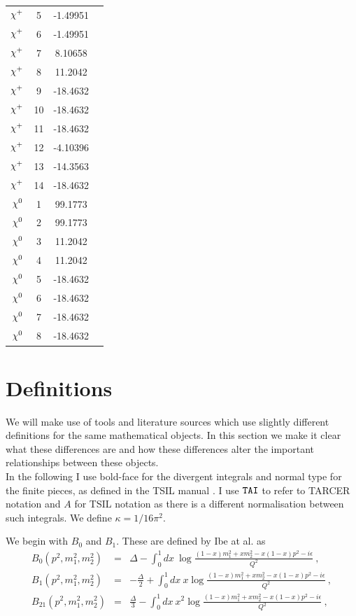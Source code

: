 \documentclass[11pt]{article}
\newcommand{\mychibig}{\raisebox{0pt}[1ex][1ex]{$\chi$}}
\newcommand{\tsil}{\textsf{TSIL} }
\newcommand{\tarcer}{\textsf{TARCER} }
\begin{document}
\begin{table}[h!]
\begin{tabular}{c c c c}
$\mychibig^+$ & 5 & -1.49951 \\ 
$\mychibig^+$ & 6 & -1.49951 \\ 
$\mychibig^+$ & 7 & 8.10658 \\ 
$\mychibig^+$ & 8 & 11.2042 \\ 
$\mychibig^+$ & 9 & -18.4632 \\ 
$\mychibig^+$ & 10 & -18.4632 \\ 
$\mychibig^+$ & 11 & -18.4632 \\ 
$\mychibig^+$ & 12 & -4.10396 \\ 
$\mychibig^+$ & 13 & -14.3563 \\ 
$\mychibig^+$ & 14 & -18.4632 \\ 
$\mychibig^0$ & 1 & 99.1773 \\ 
$\mychibig^0$ & 2 & 99.1773 \\ 
$\mychibig^0$ & 3 & 11.2042 \\ 
$\mychibig^0$ & 4 & 11.2042 \\ 
$\mychibig^0$ & 5 & -18.4632 \\ 
$\mychibig^0$ & 6 & -18.4632 \\ 
$\mychibig^0$ & 7 & -18.4632 \\ 
$\mychibig^0$ & 8 & -18.4632 \\ 
\hline\end{tabular}
\end{table}

\clearpage
\appendix
\section{Definitions}\label{sec:definitions}

We will make use of tools and literature sources which use slightly different definitions for the same mathematical objects.  In this section we make it clear what these differences are and how these differences alter the important relationships between these objects.\\

In the following I use bold-face for the divergent integrals and normal type for the finite pieces, as defined in the \tsil manual \cite{Martin2006}.  I use $\tt{TAI}$ to refer to \tarcer notation and $A$ for \tsil notation as there is a different normalisation between such integrals.  We define $\kappa = 1/16\pi^2$.

We begin with $B_0$ and $B_1$.  These are defined by Ibe at al. \cite{Ibe2013a} as
\begin{eqnarray}
B_0(p^2, m_1^2, m_2^2) &=& \Delta
- \int_0^1 dx ~\log \frac{ (1-x)m_1^2 + x m_2^2 - x(1-x)p^2 -i\epsilon }{Q^2}\ ,\label{eqn:B0_def} \\
B_1(p^2, m_1^2, m_2^2) &=& -\frac{\Delta}{2}
+ \int_0^1 dx ~x\log \frac{ (1-x)m_1^2 + x m_2^2 - x(1-x)p^2 -i\epsilon }{Q^2}\ ,\label{eqn:B1_def} \\
B_{21}(p^2, m_1^2, m_2^2) &=& \frac{\Delta}{3}
- \int_0^1 dx ~x^2\log \frac{ (1-x)m_1^2 + x m_2^2 - x(1-x)p^2 -i\epsilon }{Q^2}\ ,
\end{eqnarray}
\end{document}
